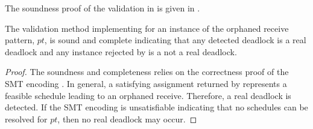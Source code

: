 The soundness proof of the validation in  is given in .

\begin{lemma}
The validation method implementing  for an instance of the orphaned receive pattern, $\mathit{pt}$, is sound and complete indicating that any detected deadlock is a real deadlock and any instance rejected by  is a not a real deadlock. 
\label{lemma:mismatch}
\end{lemma}
\begin{proof}
The soundness and completeness relies on the correctness proof of the SMT encoding \cite{DBLP:conf/kbse/HuangMM13}. In general, a satisfying assignment returned by  represents a feasible schedule leading to an orphaned receive. Therefore, a real deadlock is detected. If the SMT encoding is unsatisfiable indicating that no schedules can be resolved for $pt$, then no real deadlock may occur.
\end{proof}



